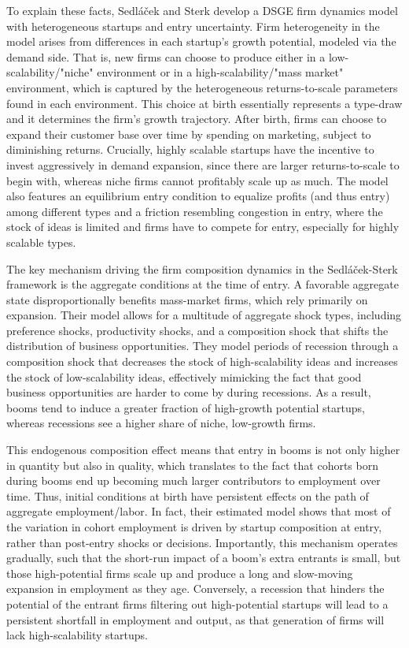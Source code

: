 \documentclass[a4paper,12pt]{article} %
\numberwithin{equation}{section} %
\numberwithin{figure}{section}
\numberwithin{table}{section}
\begin{document}
To explain these facts, Sedláček and Sterk develop a DSGE firm dynamics model with heterogeneous startups and entry uncertainty. Firm heterogeneity in the model arises
from differences in each startup's growth potential, modeled via the demand side. That is, new firms can choose to produce either in a low-scalability/"niche" 
environment or in a high-scalability/"mass market" environment, which is captured by the heterogeneous returns-to-scale parameters found in each environment. 
This choice at birth essentially represents a type-draw and it determines the firm's growth trajectory. After birth, firms can choose to expand their customer 
base over time by spending on marketing, subject to diminishing returns. Crucially, highly scalable startups have the incentive to invest aggressively in demand
expansion, since there are larger returns-to-scale to begin with, whereas niche firms cannot profitably scale up as much. 
The model also features an equilibrium entry condition to equalize profits (and thus entry) among different types and a friction resembling congestion in entry,
where the stock of ideas is limited and firms have to compete for entry, especially for highly scalable types.

The key mechanism driving the firm composition dynamics in the Sedláček-Sterk framework is the aggregate conditions at the time of entry. 
A favorable aggregate state disproportionally benefits mass-market firms, which rely primarily on expansion. 
Their model allows for a multitude of aggregate shock types, including preference shocks, productivity shocks, and a composition shock that shifts the distribution of business opportunities. 
They model periods of recession through a composition shock that decreases the stock of high-scalability ideas and increases the stock of 
low-scalability ideas, effectively mimicking the fact that good business opportunities are harder to come by during recessions. As a result, 
booms tend to induce a greater fraction of high-growth potential startups, whereas recessions see a higher share of niche, low-growth firms. 

This endogenous composition effect means that entry in booms is not only higher in quantity but also in quality, which translates to the 
fact that cohorts born during booms end up becoming much larger contributors to employment over time. Thus, initial conditions at birth 
have persistent effects on the path of aggregate employment/labor. In fact, their estimated model shows that most of the variation in 
cohort employment is driven by startup composition at entry, rather than post-entry shocks or decisions. Importantly, this mechanism 
operates gradually, such that the short-run impact of a boom's extra entrants is small, but those high-potential firms scale up and 
produce a long and slow-moving expansion in employment as they age. Conversely, a recession that hinders the potential of the entrant 
firms filtering out high-potential startups will lead to a persistent shortfall in employment and output, as that generation of firms will lack high-scalability startups.
\end{document}
